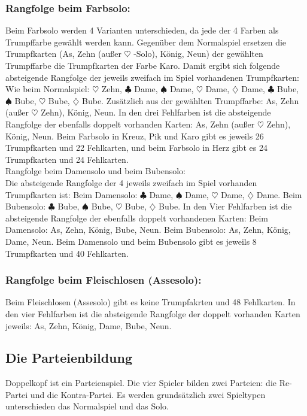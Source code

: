 \documentclass[12pt]{scrartcl}
\newcommand{\kreuz}{$\clubsuit$\xspace}
\newcommand{\pik}{$\spadesuit$\xspace}
\newcommand{\herz}{$\heartsuit$\xspace}
\newcommand{\karo}{$\diamondsuit$\xspace}
\begin{document}
\subsubsection{Rangfolge beim Farbsolo:}
Beim Farbsolo werden 4 Varianten unterschieden, da jede der 4
Farben als Trumpffarbe gewählt werden kann. Gegenüber dem
Normalspiel ersetzen die Trumpfkarten (As, Zehn (außer \herz
-Solo), König, Neun) der gewählten Trumpffarbe die Trumpfkarten
der Farbe Karo. Damit ergibt sich folgende absteigende Rangfolge
der jeweils zweifach im Spiel vorhandenen Trumpfkarten: Wie beim
Normalspiel: \herz Zehn, \kreuz Dame, \pik Dame, \herz Dame, \karo
Dame, \kreuz Bube, \pik Bube, \herz Bube, \karo Bube. Zusätzlich
aus der gewählten Trumpffarbe: As, Zehn (außer \herz Zehn),
König, Neun. In den drei Fehlfarben ist die absteigende
Rangfolge der ebenfalls doppelt vorhanden Karten: As, Zehn (außer
\herz Zehn), König, Neun. Beim Farbsolo in Kreuz, Pik und Karo
gibt es jeweils 26 Trumpfkarten und 22 Fehlkarten, und beim
Farbsolo in Herz
gibt es 24 Trumpfkarten und 24 Fehlkarten.\\
Rangfolge beim Damensolo und beim Bubensolo:\\
Die absteigende Rangfolge der 4 jeweils zweifach im Spiel
vorhanden Trumpfkarten ist: Beim Damensolo: \kreuz Dame, \pik
Dame, \herz Dame, \karo Dame. Beim Bubensolo: \kreuz Bube, \pik
Bube, \herz Bube, \karo Bube. In den Vier Fehlfarben ist die
absteigende Rangfolge der ebenfalls doppelt vorhandenen Karten:
Beim Damensolo: As, Zehn, König, Bube, Neun. Beim Bubensolo: As,
Zehn, König, Dame, Neun. Beim Damensolo und beim Bubensolo gibt
es jeweils 8 Trumpfkarten und 40 Fehlkarten.

\subsubsection{Rangfolge beim Fleischlosen (Assesolo):}
Beim Fleischlosen (Assesolo) gibt es keine Trumpfakrten und 48
Fehlkarten. In den vier Fehlfarben ist die absteigende Rangfolge
der doppelt vorhanden Karten jeweils: As, Zehn, König, Dame,
Bube, Neun.

\subsection{Die Parteienbildung}
Doppelkopf ist ein Parteienspiel. Die vier Spieler bilden zwei
Parteien: die Re-Partei und die Kontra-Partei. Es werden
grundsätzlich zwei Spieltypen unterschieden das Normalspiel und
das Solo.
\end{document}
